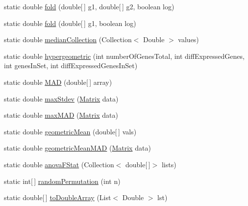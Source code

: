 \begin{DoxyCompactItemize}
\item 
static double \hyperlink{classbroad_1_1core_1_1math_1_1_statistics_a568460729d2e0305fde1d3d6d842becf}{fold} (double\mbox{[}$\,$\mbox{]} g1, double\mbox{[}$\,$\mbox{]} g2, boolean log)
\item 
static double \hyperlink{classbroad_1_1core_1_1math_1_1_statistics_a6fedeb1fa99e534577558e9e6c8ed2f4}{fold} (double\mbox{[}$\,$\mbox{]} g1, boolean log)
\item 
static double \hyperlink{classbroad_1_1core_1_1math_1_1_statistics_a1b5c105e0402bc9b1a7d70080c3bc65f}{median\+Collection} (Collection$<$ Double $>$ values)
\item 
static double \hyperlink{classbroad_1_1core_1_1math_1_1_statistics_aec0742bea562a5446361d5b85e909782}{hypergeometric} (int number\+Of\+Genes\+Total, int diff\+Expressed\+Genes, int genes\+In\+Set, int diff\+Expressed\+Genes\+In\+Set)
\item 
static double \hyperlink{classbroad_1_1core_1_1math_1_1_statistics_aac411bc30e481714437119453e8c39b8}{M\+A\+D} (double\mbox{[}$\,$\mbox{]} array)
\item 
static double \hyperlink{classbroad_1_1core_1_1math_1_1_statistics_a136ef2aec8d18c2c958e473612fe8b2c}{max\+Stdev} (\hyperlink{class_jama_1_1_matrix}{Matrix} data)
\item 
static double \hyperlink{classbroad_1_1core_1_1math_1_1_statistics_a471cb6d54d7edd179ff6795b12bb8dc1}{max\+M\+A\+D} (\hyperlink{class_jama_1_1_matrix}{Matrix} data)
\item 
static double \hyperlink{classbroad_1_1core_1_1math_1_1_statistics_a24e4eabeb0b090b80b2f0b802f1d9d46}{geometric\+Mean} (double\mbox{[}$\,$\mbox{]} vals)
\item 
static double \hyperlink{classbroad_1_1core_1_1math_1_1_statistics_a7efc9182cf4cdf0af3478207f65cb56b}{geometric\+Mean\+M\+A\+D} (\hyperlink{class_jama_1_1_matrix}{Matrix} data)
\item 
static double \hyperlink{classbroad_1_1core_1_1math_1_1_statistics_a669983d7489d37193b282ac6db5533f0}{anova\+F\+Stat} (Collection$<$ double\mbox{[}$\,$\mbox{]}$>$ lists)
\item 
static int\mbox{[}$\,$\mbox{]} \hyperlink{classbroad_1_1core_1_1math_1_1_statistics_a370e729116ea2179e452b11c06c7761a}{random\+Permutation} (int n)
\item 
static double\mbox{[}$\,$\mbox{]} \hyperlink{classbroad_1_1core_1_1math_1_1_statistics_a424a85e95e1ce61953fd0545a6569409}{to\+Double\+Array} (List$<$ Double $>$ lst)
\item 

\end{DoxyCompactItemize}
